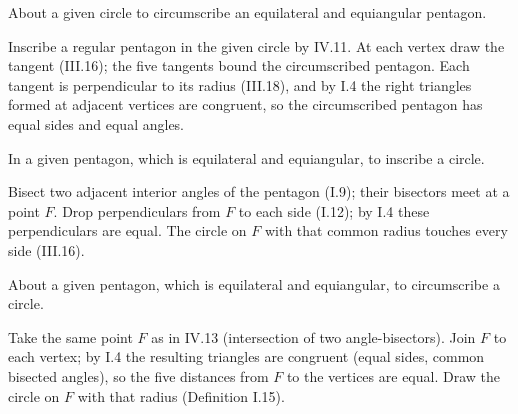 \begin{claim}
\label{prop:IV.12}
About a given circle to circumscribe an equilateral and equiangular
pentagon.
\end{claim}
\begin{evidence}[Proof of IV.12]
\label{ev:IV.12}
Inscribe a regular pentagon in the given circle by IV.11.  At each
vertex draw the tangent (III.16); the five tangents bound the
circumscribed pentagon.  Each tangent is perpendicular to its radius
(III.18), and by I.4 the right triangles formed at adjacent vertices
are congruent, so the circumscribed pentagon has equal sides and
equal angles.
\end{evidence}

\begin{claim}
\label{prop:IV.13}
In a given pentagon, which is equilateral and equiangular, to inscribe
a circle.
\end{claim}
\begin{evidence}[Proof of IV.13]
\label{ev:IV.13}
Bisect two adjacent interior angles of the pentagon (I.9); their
bisectors meet at a point $F$.  Drop perpendiculars from $F$ to each
side (I.12); by I.4 these perpendiculars are equal.  The circle on
$F$ with that common radius touches every side (III.16).
\end{evidence}

\begin{claim}
\label{prop:IV.14}
About a given pentagon, which is equilateral and equiangular, to
circumscribe a circle.
\end{claim}
\begin{evidence}[Proof of IV.14]
\label{ev:IV.14}
Take the same point $F$ as in IV.13 (intersection of two
angle-bisectors).  Join $F$ to each vertex; by I.4 the resulting
triangles are congruent (equal sides, common bisected angles), so the
five distances from $F$ to the vertices are equal.  Draw the circle
on $F$ with that radius (Definition I.15).
\end{evidence}

